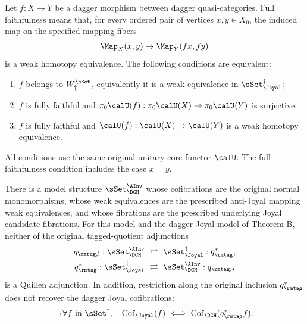 \begin{resultblock}
\begin{theorem}
Let $f:X\to Y$ be a dagger morphism between dagger quasi-categories.
Full faithfulness means that, for every ordered pair of vertices $x,y\in X_0$, the induced map on the specified mapping fibers
\begin{align}
\Map_X(x,y)\to\Map_Y(fx,fy)
\end{align}
is a weak homotopy equivalence.
The following conditions are equivalent:
\begin{enumerate}
\item $f$ belongs to $W^{\sSet}_{\dag}$, equivalently it is a weak equivalence in $\sSet^{\dag}_{\Joyal}$;
\item $f$ is fully faithful and $\pi_0\calU(f):\pi_0\calU(X)\to\pi_0\calU(Y)$ is surjective;
\item $f$ is fully faithful and $\calU(f):\calU(X)\to\calU(Y)$ is a weak homotopy equivalence.
\end{enumerate}
All conditions use the same original unitary-core functor $\calU$.
The full-faithfulness condition includes the case $x=y$.
\end{theorem}
\end{resultblock}

\begin{resultblock}
\begin{theorem}
There is a model structure $\sSet^{\AInv}_{\DCH}$ whose cofibrations are the original normal monomorphisms, whose weak equivalences are the prescribed anti-Joyal mapping weak equivalences, and whose fibrations are the prescribed underlying Joyal candidate fibrations.
For this model and the dagger Joyal model of Theorem B, neither of the original tagged-quotient adjunctions
\begin{align}
q_{\rmtag,!}:\sSet^{\AInv}_{\DCH}
&\ \rightleftarrows\ \sSet^{\dag}_{\Joyal}:q_{\rmtag}^*,\\
q_{\rmtag}^*:\sSet^{\dag}_{\Joyal}
&\ \rightleftarrows\ \sSet^{\AInv}_{\DCH}:q_{\rmtag,*}
\end{align}
is a Quillen adjunction.
In addition, restriction along the original inclusion $q_{\rmtag}^*$ does not recover the dagger Joyal cofibrations:
\begin{align}
\neg\,\forall f\text{ in }\sSet^{\dag},\quad
\Cof_{\Joyal}(f)\ \Longleftrightarrow\ \Cof_{\DCH}(q_{\rmtag}^*f).
\end{align}
\end{theorem}
\end{resultblock}
